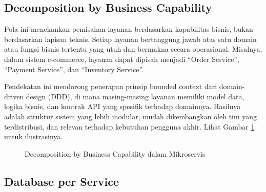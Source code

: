 \subsection{Decomposition by Business Capability}

Pola ini menekankan pemisahan layanan berdasarkan kapabilitas bisnis, bukan berdasarkan lapisan teknis. Setiap layanan bertanggung jawab atas satu domain atau fungsi bisnis tertentu yang utuh dan bermakna secara operasional. Misalnya, dalam sistem e-commerce, layanan dapat dipisah menjadi “Order Service”, “Payment Service”, dan “Inventory Service”.

Pendekatan ini mendorong penerapan prinsip bounded context dari domain-driven design (DDD), di mana masing-masing layanan memiliki model data, logika bisnis, dan kontrak API yang spesifik terhadap domainnya. Hasilnya adalah struktur sistem yang lebih modular, mudah dikembangkan oleh tim yang terdistribusi, dan relevan terhadap kebutuhan pengguna akhir. Lihat Gambar \ref{fig:decomposition-by-capability} untuk ilustrasinya.

\begin{figure}[h]
	\centering
	\caption{Decomposition by Business Capability dalam Mikroservis}
	\vspace{0.5em}
	\label{fig:decomposition-by-capability}
\end{figure}


\subsection{Database per Service}

